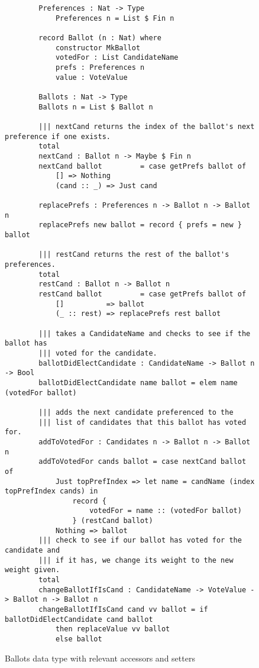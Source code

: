\begin{figure}[htbp!!!!!!!!!!!!!!]
	\caption{Ballots data type with relevant accessors and setters}
	\label{ballots_code}
    \begin{lstlisting}
        Preferences : Nat -> Type
            Preferences n = List $ Fin n

        record Ballot (n : Nat) where
            constructor MkBallot
            votedFor : List CandidateName
            prefs : Preferences n
            value : VoteValue
        
        Ballots : Nat -> Type
        Ballots n = List $ Ballot n

        ||| nextCand returns the index of the ballot's next preference if one exists. 
        total
        nextCand : Ballot n -> Maybe $ Fin n
        nextCand ballot         = case getPrefs ballot of
            [] => Nothing
            (cand :: _) => Just cand

        replacePrefs : Preferences n -> Ballot n -> Ballot n
        replacePrefs new ballot = record { prefs = new } ballot

        ||| restCand returns the rest of the ballot's preferences. 
        total
        restCand : Ballot n -> Ballot n
        restCand ballot         = case getPrefs ballot of
            []          => ballot
            (_ :: rest) => replacePrefs rest ballot

        ||| takes a CandidateName and checks to see if the ballot has 
        ||| voted for the candidate. 
        ballotDidElectCandidate : CandidateName -> Ballot n -> Bool
        ballotDidElectCandidate name ballot = elem name (votedFor ballot)
        
        ||| adds the next candidate preferenced to the
        ||| list of candidates that this ballot has voted for. 
        addToVotedFor : Candidates n -> Ballot n -> Ballot n
        addToVotedFor cands ballot = case nextCand ballot of
            Just topPrefIndex => let name = candName (index topPrefIndex cands) in 
                record { 
                    votedFor = name :: (votedFor ballot) 
                } (restCand ballot)
            Nothing => ballot
        ||| check to see if our ballot has voted for the candidate and 
        ||| if it has, we change its weight to the new weight given. 
        total
        changeBallotIfIsCand : CandidateName -> VoteValue -> Ballot n -> Ballot n
        changeBallotIfIsCand cand vv ballot = if ballotDidElectCandidate cand ballot
            then replaceValue vv ballot
            else ballot
    \end{lstlisting}
\end{figure}


